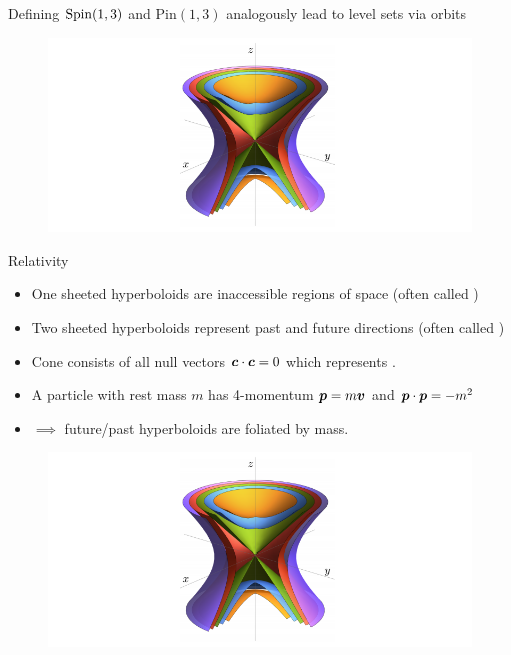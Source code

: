 \documentclass[aspectratio=169]{beamer}
\begin{document}
\begin{frame}{}
\vfill
\centering Defining $\mathrm{Spin}(1,3)$ and $\mathrm{Pin}(1,3)$ analogously lead to level sets via orbits
\begin{figure}[H]
\centering
\includegraphics[width=.8\textwidth]{figures/lorentzian.png}
\end{figure}
\end{frame}

\begin{frame}{Relativity}
\vfill
\begin{itemize}
	\item One sheeted hyperboloids are inaccessible regions of space (often called )
	\item Two sheeted hyperboloids represent past and future directions (often called )
	\item Cone consists of all null vectors $\boldsymbol{c}\cdot \boldsymbol{c} = 0$ which represents .
	\item A particle with rest mass $m$ has 4-momentum $\boldsymbol{p}=m\boldsymbol{v}$ and $\boldsymbol{p}\cdot \boldsymbol{p}=-m^2$
	\item $\implies$ future/past hyperboloids are foliated by mass.
\end{itemize}
\begin{figure}[H]
\centering
\includegraphics[width=.8\textwidth]{figures/lorentzian.png}
\end{figure}
\vfill
\end{frame}
\end{document}
